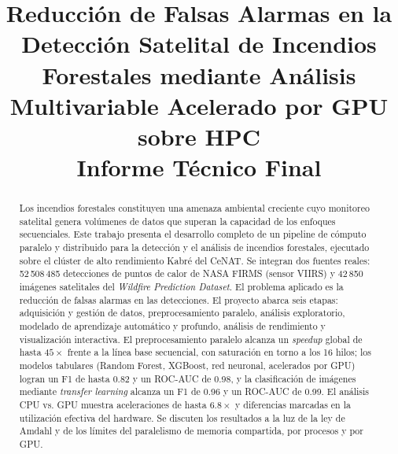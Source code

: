 \documentclass[conference]{IEEEtran}
\begin{document}
\title{Reducción de Falsas Alarmas en la Detección Satelital de Incendios Forestales mediante Análisis Multivariable Acelerado por GPU sobre HPC\\
\large{Informe Técnico Final}}

\author{
}

\maketitle

\begin{abstract}
Los incendios forestales constituyen una amenaza ambiental creciente cuyo monitoreo satelital genera volúmenes de datos que superan la capacidad de los enfoques secuenciales. Este trabajo presenta el desarrollo completo de un pipeline de cómputo paralelo y distribuido para la detección y el análisis de incendios forestales, ejecutado sobre el clúster de alto rendimiento Kabré del CeNAT. Se integran dos fuentes reales: 52\,508\,485 detecciones de puntos de calor de NASA FIRMS (sensor VIIRS) y 42\,850 imágenes satelitales del \textit{Wildfire Prediction Dataset}. El problema aplicado es la reducción de falsas alarmas en las detecciones. El proyecto abarca seis etapas: adquisición y gestión de datos, preprocesamiento paralelo, análisis exploratorio, modelado de aprendizaje automático y profundo, análisis de rendimiento y visualización interactiva. El preprocesamiento paralelo alcanza un \textit{speedup} global de hasta $45\times$ frente a la línea base secuencial, con saturación en torno a los 16 hilos; los modelos tabulares (Random Forest, XGBoost, red neuronal, acelerados por GPU) logran un F1 de hasta 0.82 y un ROC-AUC de 0.98, y la clasificación de imágenes mediante \textit{transfer learning} alcanza un F1 de 0.96 y un ROC-AUC de 0.99. El análisis CPU vs. GPU muestra aceleraciones de hasta $6.8\times$ y diferencias marcadas en la utilización efectiva del hardware. Se discuten los resultados a la luz de la ley de Amdahl y de los límites del paralelismo de memoria compartida, por procesos y por GPU.
\end{abstract}
\end{document}
